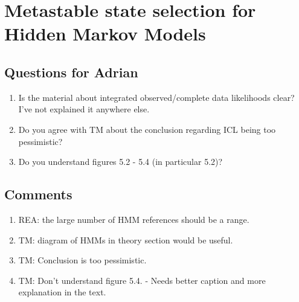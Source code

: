 \let\textcircled=\pgftextcircled
\chapter{Metastable state selection for Hidden Markov Models}
\label{chap:hmm}


\section{Questions for Adrian}
\begin{enumerate}
    \item Is the material about integrated observed/complete data likelihoods clear? I've not explained it anywhere else.  
    \item Do you agree with TM about the conclusion regarding ICL being too pessimistic? 
    \item  Do you understand figures 5.2 - 5.4 (in particular 5.2)?
\end{enumerate}

\section{Comments}
\begin{enumerate}
\item REA: the large number of HMM references should be a range. 
\item TM: diagram of HMMs in theory section would be useful.
\item TM: Conclusion is too pessimistic. 
\item TM: Don't understand figure 5.4. - Needs better caption and more explanation in the text.  

\end{enumerate}


